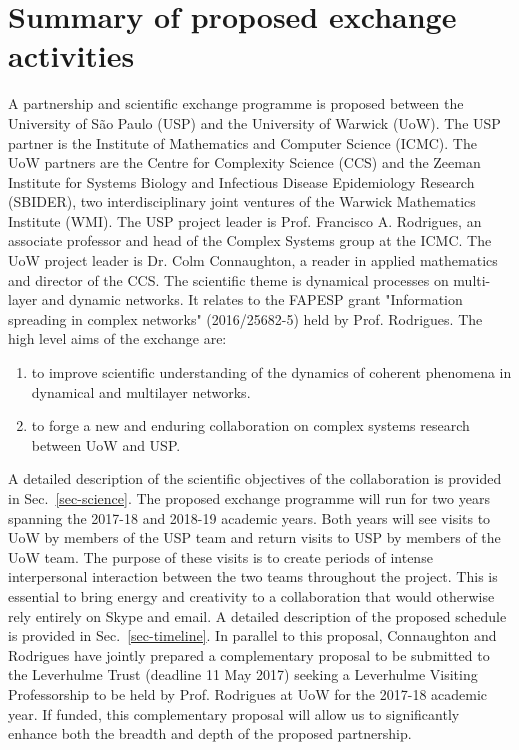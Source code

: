 \section{Summary of proposed exchange activities}
A partnership and scientific exchange programme is proposed between the 
University of S\~{a}o Paulo (USP) and the University of Warwick (UoW). The USP 
partner is the Institute of Mathematics and Computer Science (ICMC). The UoW 
partners are the Centre for Complexity Science (CCS) and the Zeeman Institute 
for Systems Biology and Infectious Disease Epidemiology Research (SBIDER), two  
interdisciplinary joint ventures of the Warwick Mathematics Institute (WMI). The USP 
project leader is Prof. Francisco A. Rodrigues, an associate professor and head 
of the Complex Systems group at the ICMC. The UoW project leader is Dr. Colm 
Connaughton, a reader in applied mathematics and director of the CCS. The 
scientific theme is dynamical processes on 
multi-layer and dynamic networks. It relates to the FAPESP grant "Information 
spreading in complex networks" (2016/25682-5) held by Prof. Rodrigues. The high level aims of the exchange are:
\begin{enumerate}
\itemsep\myitemsep
\item to improve scientific understanding of the dynamics of coherent phenomena 
in dynamical and multilayer networks.
\item to forge a new and enduring collaboration on complex systems research between UoW and USP.
\end{enumerate}
A detailed description of the scientific objectives of the collaboration is 
provided in Sec.~\ref{sec-science}. The proposed exchange programme will run 
for two years spanning the 2017-18 and 2018-19 academic years. Both years 
will see visits to UoW by members of the USP team and 
return visits to USP by members of the UoW team. The purpose of these visits is to create periods of intense interpersonal interaction between the two teams throughout the project. This is essential to bring energy and creativity to a collaboration that would otherwise rely entirely on Skype and email. A detailed description of the 
proposed schedule is provided in Sec.~\ref{sec-timeline}. In parallel to this 
proposal, Connaughton and Rodrigues have jointly prepared a complementary 
proposal to be submitted to the Leverhulme Trust (deadline 11 May 2017) seeking 
a Leverhulme Visiting Professorship to be held by Prof. Rodrigues at UoW for 
the 2017-18 academic year. If funded, this complementary proposal will allow us 
to significantly enhance both the breadth and depth of the proposed partnership.

